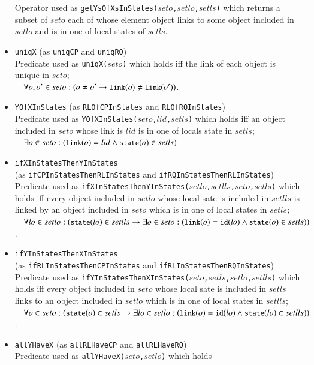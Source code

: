 \documentclass[12pt]{report}
\newcommand{\ra}{\rightarrow}
\newcommand{\mbstt}[1]{\mbox{\small{\tt {#1}}}}
\newcommand{\stt}[1]{{\small{\tt {#1}}}}
\begin{document}
\begin{itemize}
  Operator used as \stt{getYsOfXsInStates($seto$,$setlo$,$setls$)}
  which returns a subset of $seto$ each of whose element object links
  to some object included in $setlo$ and is in one of local states of
  $setls$.
\item \stt{uniqX} (as \stt{uniqCP} and \stt{uniqRQ})\\
  Predicate used as \stt{uniqX($seto$)} which holds iff the
  link of each object is unique in $seto$;\\$~~~~\forall o,o'\in
  seto:(o\ne o'\ra\mbstt{link}(o)\ne\mbstt{link}(o'))$.
\item \stt{YOfXInStates} (as \stt{RLOfCPInStates} and \stt{RLOfRQInStates})\\
  Predicate used as \stt{YOfXInStates($seto$,$lid$,$setls$)} which
  holds iff an object included in $seto$ whose link is $lid$
  is in one of locals state in $setls$;\\$~~~~\exists o\in
  seto:(\mbstt{link}(o)=lid\land\mbstt{state}(o)\in setls)$.
\item \stt{ifXInStatesThenYInStates}\\
(as \stt{ifCPInStatesThenRLInStates} and \stt{ifRQInStatesThenRLInStates})\\
  Predicate used as
  \stt{ifXInStatesThenYInStates($setlo$,$setlls$,$seto$,$setls$)}
  which holds iff every object included in $setlo$ whose local
  sate is included in $setlls$ is linked by an object included in $seto$
  which is in one of local states in $setls$;\\$~~~~
    \forall lo\in setlo:(\mbstt{state}(lo)\in setlls\ra \exists o\in
    seto: (\mbstt{link}(o)=\mbstt{id}(lo)\land\mbstt{state}(o)\in
    setls))$.
\item \stt{ifYInStatesThenXInStates}\\
(as \stt{ifRLInStatesThenCPInStates} and \stt{ifRLInStatesThenRQInStates})\\
  Predicate used as
  \stt{ifYInStatesThenXInStates($seto$,$setls$,$setlo$,$setlls$)}
  which holds iff every object included in $seto$ whose local
  sate is included in $setls$ links to an object included in $setlo$
  which is in one of local states in $setlls$;\\
  $~~~~\forall o\in seto:(\mbstt{state}(o)\in setls\ra \exists lo\in
    setlo: (\mbstt{link}(o)=\mbstt{id}(lo)\land\mbstt{state}(lo)\in
    setlls))$.
\item \stt{allYHaveX} (as \stt{allRLHaveCP} and \stt{allRLHaveRQ})\\
  Predicate used as \stt{allYHaveX($seto$,$setlo$)} which holds

\end{itemize}
\end{document}
